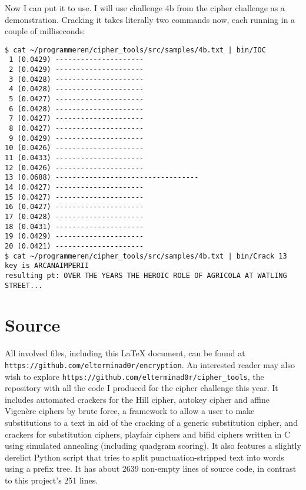 \documentclass{article}
\begin{document}
    Now I can put it to use. I will use challenge 4b from the cipher challenge
    as a demonstration. Cracking it takes literally two commands now, each
    running in a couple of milliseconds:

\begin{lstlisting}[caption=Cracking 4b, label={lst:iocchart}]
$ cat ~/programmeren/cipher_tools/src/samples/4b.txt | bin/IOC 
 1 (0.0429) ---------------------
 2 (0.0429) ---------------------
 3 (0.0428) ---------------------
 4 (0.0428) ---------------------
 5 (0.0427) ---------------------
 6 (0.0428) ---------------------
 7 (0.0427) ---------------------
 8 (0.0427) ---------------------
 9 (0.0429) ---------------------
10 (0.0426) ---------------------
11 (0.0433) ---------------------
12 (0.0426) ---------------------
13 (0.0688) ----------------------------------
14 (0.0427) ---------------------
15 (0.0427) ---------------------
16 (0.0427) ---------------------
17 (0.0428) ---------------------
18 (0.0431) ---------------------
19 (0.0429) ---------------------
20 (0.0421) ---------------------
$ cat ~/programmeren/cipher_tools/src/samples/4b.txt | bin/Crack 13
key is ARCANAIMPERII
resulting pt: OVER THE YEARS THE HEROIC ROLE OF AGRICOLA AT WATLING STREET...
\end{lstlisting}

    \section{Source} All involved files, including this \LaTeX{} document, can
    be found at \verb|https://github.com/elterminad0r/encryption|. An
    interested reader may also wish to explore
    \verb|https://github.com/elterminad0r/cipher_tools|, the repository with
    all the code I produced for the cipher challenge this year. It includes
    automated crackers for the Hill cipher, autokey cipher and affine
    Vigen\`ere ciphers by brute force, a framework to allow a user to make
    substitutions to a text in aid of the cracking of a generic substitution
    cipher, and crackers for substitution ciphers, playfair ciphers and bifid
    ciphers written in C using simulated annealing (including quadgram
    scoring). It also features a slightly derelict Python script that tries to
    split punctuation-stripped text into words using a prefix tree. It has
    about 2639 non-empty lines of source code, in contrast to this project's
    251 lines.
\end{document}
